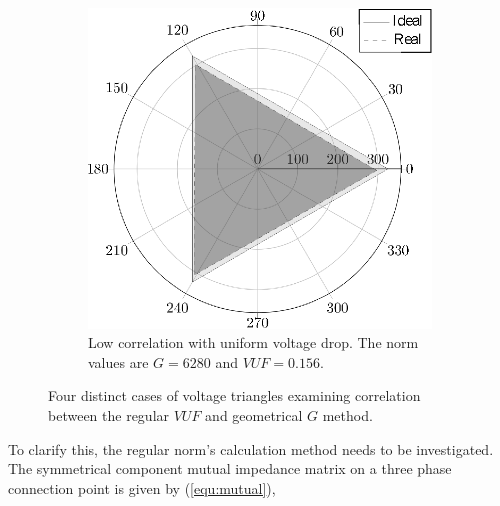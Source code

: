\begin{figure}
\begin{subfigure}[b]{0.48\textwidth}
                    \includegraphics[width=\textwidth]{Unblance_EPS_Pics/EPS_images/circle.eps}
                    \caption{\centering Low correlation with uniform voltage drop. The norm values are $G=6280$ and $VUF=0.156$.}
                    \label{fig:cases_D}
                \end{subfigure}


                \caption{Four distinct cases of voltage triangles examining correlation between the regular $VUF$ and geometrical $G$ method.}\label{fig:cases}
            \end{figure}

To clarify this, the regular norm's calculation method needs to be investigated. The symmetrical component mutual impedance matrix on a three phase connection point is given by (\ref{equ:mutual}),


